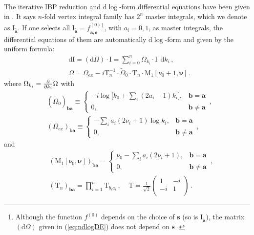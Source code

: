 \documentclass[a4paper,11pt]{article}
\newcommand{\nn}{\nonumber}
\newcommand{\nd}{\mathrm{d}}
\def\eref#1{(\ref{#1})}
\def\ie{\begin{equation}\begin{aligned}}
\def\fe{\end{aligned}\end{equation}}
\begin{document}
The iterative IBP reduction and $\nd \log$-form differential equations have been given in \cite{Chen:2023iix}. It says $n$-fold vertex integral family has $2^n$ master integrals, which we 
denote as $\text{I}_{\tilde{\bm{a}}}$. 
If one selects all $\text{I}_{\tilde{\bm{a}}}= f^{(0)}_{\tilde{\bm{a}},\bm{s}}$\footnote{Although the function $f^{(0)}$ depends on the choice of $\bm{s}$ (so is $\text{I}_{\tilde{\bm{a}}}$), the matrix $(\nd \Omega)$ given in \eref{eq:ndlogDE} does not depend on $\bm{s}$ \cite{Chen:2023iix}. %
 }, with $a_i=0,1$, as  master integrals, the differential equations of them are automatically $\nd \log$-form and given by the uniform formula:
\begin{align}
&\nd \text{I} = (\nd \Omega) \cdot \text{I}  = \sum_{i=0}^{n} \Omega_{k_i} \cdot \text{I}  ~~\nd k_i  \, ,\nn\\
&\Omega =  \Omega_{ex} - i \text{T}_n^{-1}\cdot  \tilde{\Omega}_0 \cdot \text{T}_n \cdot \text{M}_1[\nu_0+1,\bm{\nu}] \, .\label{eq:ndlogDE}
\end{align}
where $\Omega_{k_i}={\partial \over \partial k_i}\Omega $
with
\ie \label{eq:omega-form}
&\left( \tilde{\Omega}_0 \right)_{\bm{b}\bm{a}}  \equiv \begin{cases} - i \log \Big[ k_0+\sum_i (2a_i-1)k_i\Big] , & \bm{b}=\bm{a} \\
0, & \bm{b}\neq \bm{a} 
\end{cases} \, , \\
&\left( \Omega_{ex} \right)_{\bm{b}\bm{a}}  \equiv \begin{cases} - \sum_i a_i(2\nu_i+1) \log k_i , & \bm{b}=\bm{a} \\
0, & \bm{b}\neq \bm{a} 
\end{cases} \, ,
\fe
and
\ie \label{eq:M-form}
&~~\left(\text{M}_1[\nu_0,\bm{\nu}]\right)_{\bm{b}\bm{a}}= \begin{cases}
\nu_0-\sum_i a_i(2\nu_i+1) , & \bm{b}=\bm{a} \\
0, & \bm{b}\neq \bm{a}\end{cases}\, ,\\
&~~\left(\text{T}_n\right)_{\bm{b}\bm{a}}=\prod_{i=1}^n \text{T}_{b_i a_i}  \, ,
~~~~~ \text{T}=\frac{1}{\sqrt{2}}\left(
\begin{array}{cc}
 1 & -i \\
 -i & 1 \\
\end{array}
\right)  \, .
\fe
\end{document}
